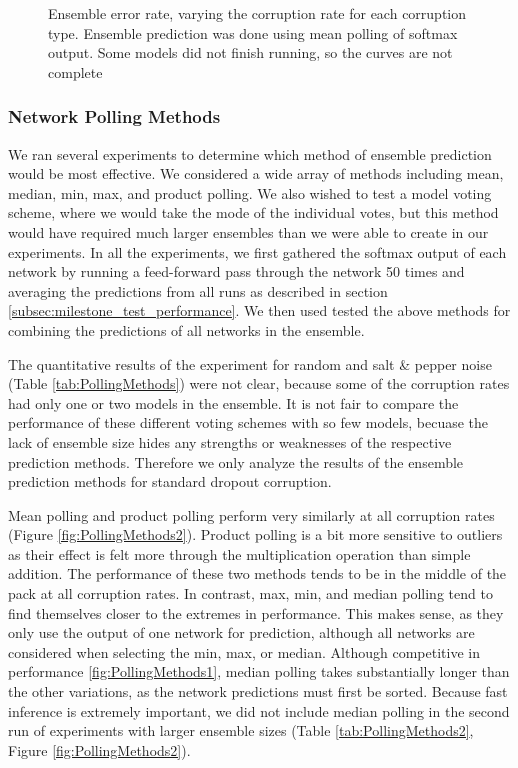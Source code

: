 \documentclass{article} %
\begin{document}
\begin{figure}[]
\begin{minipage}{.75\textwidth}
  \label{fig:ecr_sp}
\end{minipage}
\caption{Ensemble error rate, varying the corruption rate for each corruption type. Ensemble prediction was done using mean polling of softmax output. Some models did not finish running, so the curves are not complete}
\label{fig:ensemble_corruption_rate}
\end{figure}

\subsubsection{Network Polling Methods}
\label{subsec:polling}

We ran several experiments to determine which method of ensemble prediction would be most effective. We considered a wide array of methods including mean, median, min, max, and product polling. We also wished to test a model voting scheme, where we would take the mode of the individual votes, but this method would have required much larger ensembles than we were able to create in our experiments. In all the experiments, we first gathered the softmax output of each network by running a feed-forward pass through the network 50 times and averaging the predictions from all runs as described in section \ref{subsec:milestone_test_performance}. We then used tested the above methods for combining the predictions of all networks in the ensemble.

The quantitative results of the experiment for random and salt \& pepper noise (Table \ref{tab:PollingMethods}) were not clear, because some of the corruption rates had only one or two models in the ensemble. It is not fair to compare the performance of these different voting schemes with so few models, becuase the lack of ensemble size hides any strengths or weaknesses of the respective prediction methods. Therefore we only analyze the results of the ensemble prediction methods for standard dropout corruption.

Mean polling and product polling perform very similarly at all corruption rates (Figure \ref{fig:PollingMethods2}). Product polling is a bit more sensitive to outliers as their effect is felt more through the multiplication operation than simple addition. The performance of these two methods tends to be in the middle of the pack at all corruption rates. In contrast, max, min, and median polling tend to find themselves closer to the extremes in performance. This makes sense, as they only use the output of one network for prediction, although all networks are considered when selecting the min, max, or median. Although competitive in performance \ref{fig:PollingMethods1}, median polling takes substantially longer than the other variations, as the network predictions must first be sorted. Because fast inference is extremely important, we did not include median polling in the second run of experiments with larger ensemble sizes (Table \ref{tab:PollingMethods2}, Figure \ref{fig:PollingMethods2}).
\end{document}
